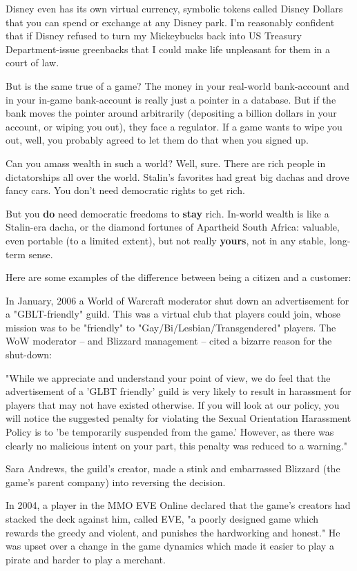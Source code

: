 Disney even has its own virtual currency, symbolic tokens called
Disney Dollars that you can spend or exchange at any Disney park.
I'm reasonably confident that if Disney refused to turn my
Mickeybucks back into US Treasury Department-issue greenbacks that
I could make life unpleasant for them in a court of law.

But is the same true of a game? The money in your real-world
bank-account and in your in-game bank-account is really just a
pointer in a database. But if the bank moves the pointer around
arbitrarily (depositing a billion dollars in your account, or
wiping you out), they face a regulator. If a game wants to wipe you
out, well, you probably agreed to let them do that when you signed
up.

Can you amass wealth in such a world? Well, sure. There are rich
people in dictatorships all over the world. Stalin's favorites had
great big dachas and drove fancy cars. You don't need democratic
rights to get rich.

But you \textbf{do} need democratic freedoms to \textbf{stay} rich.
In-world wealth is like a Stalin-era dacha, or the diamond fortunes
of Apartheid South Africa: valuable, even portable (to a limited
extent), but not really \textbf{yours}, not in any stable,
long-term sense.

Here are some examples of the difference between being a citizen
and a customer:

In January, 2006 a World of Warcraft moderator shut down an
advertisement for a "GBLT-friendly" guild. This was a virtual club
that players could join, whose mission was to be "friendly" to
"Gay/Bi/Lesbian/Transgendered" players. The WoW moderator -- and
Blizzard management -- cited a bizarre reason for the shut-down:

"While we appreciate and understand your point of view, we do feel
that the advertisement of a 'GLBT friendly' guild is very likely to
result in harassment for players that may not have existed
otherwise. If you will look at our policy, you will notice the
suggested penalty for violating the Sexual Orientation Harassment
Policy is to 'be temporarily suspended from the game.' However, as
there was clearly no malicious intent on your part, this penalty
was reduced to a warning."

Sara Andrews, the guild's creator, made a stink and embarrassed
Blizzard (the game's parent company) into reversing the decision.

In 2004, a player in the MMO EVE Online declared that the game's
creators had stacked the deck against him, called EVE, "a poorly
designed game which rewards the greedy and violent, and punishes
the hardworking and honest." He was upset over a change in the game
dynamics which made it easier to play a pirate and harder to play a
merchant.

